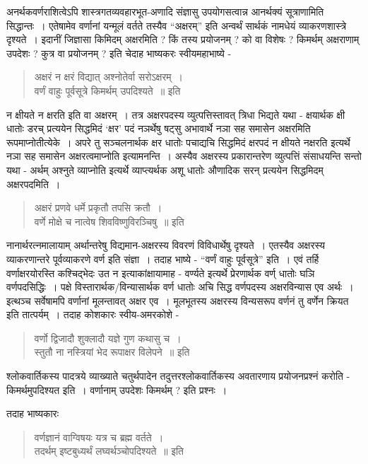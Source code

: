 {अनर्थकवर्णराशित्वेऽपि शास्त्रगतव्यवहारभूत-अणादि संज्ञासु उपयोगसत्वान्न आनर्थक्यं सूत्राणामिति सिद्धान्तः~। एतेषामेव वर्णानां यन्मूलं वर्तते तस्यैव “अक्षरम्” इति अन्वर्थं सार्थकं नामधेयं व्याकरणशास्त्रे दृश्यते~। इदानीं जिज्ञासा किमिदम् अक्षरमिति ? किं तस्य प्रयोजनम् ? को वा विशेषः ? किमर्थम् अक्षराणाम् उपदेशः ? कुत्र वा प्रयोजनम् ? इति चेदाह भाष्यकरः स्वीयमहाभाष्ये - 		
\begin{verse}
अक्षरं न क्षरं विद्यात्  अश्नोतेर्वा सरोऽक्षरम्~। \\
वर्णं वाहुः पूर्वसूत्रे किमर्थम् उपदिश्यते~॥ इति
\end{verse}
न क्षीयते न क्षरति इति वा अक्षरम्~। तत्र अक्षरपदस्य व्युत्पत्तिस्तावत् त्रिधा भिद्यते यथा - क्षयार्थक क्षी धातोः डरच् प्रत्ययेन सिद्धमिदं ‘क्षर’ पदं नञर्थेषु षट्सु अभावार्थे नञा सह समासेन अक्षरमिति रूपमाप्नोतीत्येके~। अपरे तु सञ्चलनार्थक क्षर धातोः पचाद्यचि सिद्धमिदं क्षरपदं न क्षीयते नक्षरति इत्यर्थे नञा सह समासेन अक्षरत्वमाप्नोति इत्यामनन्ति~। अस्यैव अक्षरस्य  प्रकारान्तरेण व्युत्पत्तिं संसाधयन्ति सन्तो यथा - अर्थम् अश्नुते व्याप्नोति इत्यर्थे व्याप्त्यर्थक अशू धातोः औणादिक सरन् प्रत्ययेन सिद्धमिदम् अक्षरपदमिति~। 
\begin{verse}
अक्षरं प्रणवे धर्मे प्रकृतौ तपसि क्रतौ~। \\
वर्णे मोक्षे च नात्वेष शिवविष्णुविरञ्चिषु~॥ इति
\end{verse}
नानार्थरत्नमालायाम् अर्थान्तरेषु विद्यमान-अक्षरस्य विवरणं विविधार्थेषु दृश्यते~। एतस्यैव अक्षरस्य व्याकरणान्तरे पूर्वव्याकरणे वर्ण इति संज्ञा~। तदाह भाष्ये - “वर्णं वाहुः पूर्वसूत्रे” इति~। एवं तर्हि वर्णाक्षरयोरस्ति कश्चिद्भेदः उत न इत्याकांक्षायामाह - वर्ण्यते इत्यर्थे प्रेरणार्थक वर्ण् धातोः घञि वर्णपदसिद्धिः~। पक्षे विस्तारार्थक/विन्यासार्थक वर्ण धातोः अचि सिद्ध वर्णपदस्य अक्षरविन्यास एव अर्थः~। इत्थञ्च सर्वेषामपि वर्णानां मूलन्तावत् अक्षर एव~। मूलभूतस्य अक्षरस्य विन्यसरूप वर्णनं तु वर्णेन क्रियत इति तात्पर्यम्~। तदाह कोशकारः स्वीय-अमरकोशे -
\begin{verse}
वर्णो द्विजादौ शुक्लादौ यज्ञे गुण कथासु च~। \\
स्तुतौ ना नस्त्रियां भेद रूपाक्षर विलेपने~॥  इति
\end{verse}
श्लोकवार्तिकस्य पादत्रये व्याख्याते चतुर्थपादेन तदुत्तरश्लोकवार्तिकस्य अवतारणाय प्रयोजनप्रश्नं करोति - किमर्थमुपदिश्यत इति~। वर्णानाम् उपदेशः किमर्थम् ? इति प्रश्नः~। 

तदाह भाष्यकारः 		
\begin{verse}
वर्णज्ञानं वाग्विषयः यत्र च ब्रह्म वर्तते~। \\
तदर्थम् इष्टबुध्यर्थं लघ्वर्थञ्चोपदिश्यते~॥ इति
\end{verse}

}
